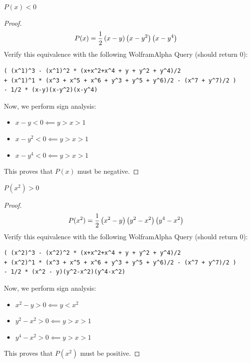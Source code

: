 \documentclass[10pt]{../usamts}
\begin{document}
\begin{solution}
\begin{claim}
    $P(x) < 0$
    \label{claim:px}
\end{claim}
\begin{proof}
    $$P(x) = \frac{1}{2}\left( x-y \right)\left( x-y^2 \right)\left( x-y^4 \right)$$
    Verify this equivalence with the following WolframAlpha Query (should return 0): 
    \begin{verbatim}
( (x^1)^3 - (x^1)^2 * (x+x^2+x^4 + y + y^2 + y^4)/2 
+ (x^1)^1 * (x^3 + x^5 + x^6 + y^3 + y^5 + y^6)/2 - (x^7 + y^7)/2 )
- 1/2 * (x-y)(x-y^2)(x-y^4)
    \end{verbatim}
    Now, we perform sign analysis:
    \begin{itemize}
        \item $x - y < 0 \impliedby y > x > 1$
        \item $x - y^2 < 0 \impliedby y > x > 1$
        \item $x - y^4 < 0 \impliedby y > x > 1$
    \end{itemize}
    This proves that $P(x)$ must be negative.
\end{proof}

\begin{claim}
    $P(x^2) > 0$
    \label{claim:px2}
\end{claim}
\begin{proof}
    $$P(x^2) = \frac{1}{2} \left( x^2-y \right)\left( y^2 - x^2 \right)\left( y^4 - x^2 \right)$$
    Verify this equivalence with the following WolframAlpha Query (should return 0): 
    \begin{verbatim}
( (x^2)^3 - (x^2)^2 * (x+x^2+x^4 + y + y^2 + y^4)/2 
+ (x^2)^1 * (x^3 + x^5 + x^6 + y^3 + y^5 + y^6)/2 - (x^7 + y^7)/2 )
- 1/2 * (x^2 - y)(y^2-x^2)(y^4-x^2)
    \end{verbatim}
    Now, we perform sign analysis:
    \begin{itemize}
        \item $x^2 - y > 0 \impliedby y < x^2$
        \item $y^2 - x^2 > 0 \impliedby y > x > 1$
        \item $y^4 - x^2 > 0 \impliedby y > x > 1$
    \end{itemize}
    This proves that $P(x^2)$ must be positive.
\end{proof}


\end{solution}
\end{document}
